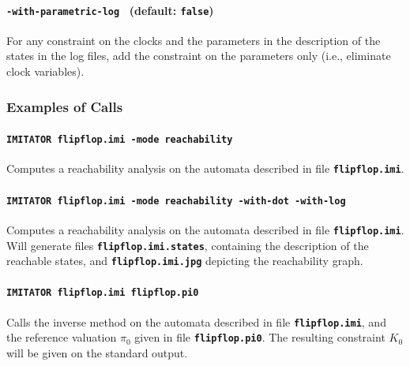 \documentclass[a4paper,11pt]{article}
\newcommand{\imitator}{\textsc{Imitator}}
\newcommand{\imitatorExec}{\code{IMITATOR}}
\newcommand{\code}[1]{\textbf{\texttt{#1}}}
\begin{document}
\paragraph{\code{-with-parametric-log } (default: \code{false})}
For any constraint on the clocks and the parameters in the description of the states in the log files,
add the constraint on the parameters only (i.e., eliminate clock variables).




\subsubsection{Examples of Calls}

\paragraph{\code{\imitatorExec{} flipflop.imi -mode reachability}}
Computes a reachability analysis on the automata described in file \code{flipflop.imi}.

\paragraph{\code{\imitatorExec{} flipflop.imi -mode reachability -with-dot -with-log}}
Computes a reachability analysis on the automata described in file \code{flipflop.imi}.
Will generate files \code{flipflop.imi.states}, containing the description of the reachable states, and \code{flipflop.imi.jpg} depicting the reachability graph.


\paragraph{\code{\imitatorExec{} flipflop.imi flipflop.pi0}}
Calls the inverse method on the automata described in file \code{flipflop.imi}, and the reference valuation $\pi_0$ given in file \code{flipflop.pi0}.
The resulting constraint $K_0$ will be given on the standard output.
\end{document}
